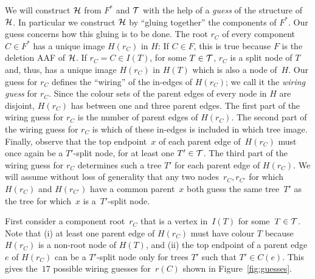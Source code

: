 We {will} construct $\mathcal{H}$ from $F^*$ and $\mathcal{T}$ with the help of a
\emph{guess} of the structure of $\mathcal{H}$.
In particular we construct $\mathcal{H}$ by ``gluing together'' the components
of $F^*$. Our guess concerns how this gluing is to be done.
The root $r_C$ of every component $C \in F^*$ has a unique image $H(r_C)$ in
$H$:
If $C \in F$, this is true because $F$ is the deletion AAF of $\mathcal{H}$.
If $r_C = C \in I(T)$, for some $T \in \mathcal{T}$, $r_C$ is a split node of
{$T$ and, thus, has a unique image $H(r_C)$ in $H(T)$ which is also a node of~$H$}.
Our guess for $r_C$ defines the ``wiring'' of the in-edges of $H(r_C)$;
we call it the \emph{wiring guess} for $r_C$.
Since the colour sets of the parent edges of every node in $H$ are disjoint,
$H(r_C)$ has between one and three parent edges.
The first part of the wiring guess for $r_C$ is the number of parent edges of
$H(r_C)$.
The second part of the wiring guess for $r_C$ is which of these in-edges is
included in which tree image.
Finally, observe that the top endpoint~$x$ of each parent edge of~$H(r_C)$ must
once again be a $T'$-split node, for at least one $T' \in \mathcal{T}$.
The third part of the wiring guess for $r_C$ determines such a tree $T'$ for
each parent edge of $H(r_C)$. {We will assume without loss of generality that any two nodes~$r_C,r_{C'}$ for which $H(r_C)$ and $H(r_{C'})$ have a common parent~$x$ both guess the same tree~$T'$ as the tree for which~$x$ is a~$T'$-split node.}

{First consider a component root~$r_C$ that is a vertex in~$I(T)$ for some~$T\in\mathcal{T}$.}
Note that (i) at least one parent edge of $H(r_C)$ must have colour $T$ because
$H(r_C)$ is {a non-root node} of $H(T)$, and (ii) the top endpoint
of a parent edge $e$ of $H(r_C)$ can be a $T'$-split node only for trees $T'$
such that $T' \in C(e)$.
This gives the~$17$ possible wiring guesses for~$r(C)$ shown in Figure~\ref{fig:guesses}.

